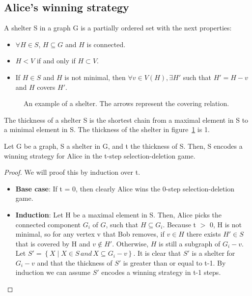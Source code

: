 \subsection{Alice's winning strategy}
\begin{definition}
A shelter S in a graph G is a partially ordered set with the next properties:
\begin{itemize}
  \item $\forall H \in S$, $H \subseteq G$ and $H$ is connected.
  \item $H < V$ if and only if $H \subset V$.
  \item If $H \in S$ and $H$ is not minimal, then $\forall v \in V(H), \exists H'$ such that $H' = H - v$ and $H$ covers $H'$.
\end{itemize}
\end{definition}

\begin{figure}[H]

\caption{An example of a shelter. The arrows represent the covering relation. \label{fig:shelter-example}}
\end{figure}
The thickness of a shelter S is the shortest chain from a maximal element in S to a minimal element in S. The thickness of the shelter in figure~\ref{fig:shelter-example} is 1.
\begin{lemma}
Let G be a graph, S a shelter in G, and t the thickness of S. Then, S encodes a winning strategy for Alice in the t-step selection-deletion game.
\label{lemma:Alice-win}
\end{lemma}
\begin{proof}
We will proof this by induction over t.
\begin{itemize}
  \item \textbf{Base case}: If t = 0, then clearly Alice wins the 0-step selection-deletion game.
  \item \textbf{Induction}: Let H be a maximal element in S. Then, Alice picks the connected component $G_i$ of $G$, such that $H \subseteq G_i$. Because t $>$ 0, H is not minimal, so for any vertex v that Bob removes, if $v \in H$ there exists $H' \in S$ that is covered by H and $v \notin H'$. Otherwise, $H$ is still a subgraph of $G_i - v$. Let $S' =\left\{X \mid X \in S \, and \, X \subseteq G_i - v\right\}$. It is clear that $S'$ is a shelter for $G_i - v$ and that the thickness of $S'$ is greater than or equal to t-1. By induction we can assume $S'$ encodes a winning strategy in t-1 steps.
\end{itemize}
\end{proof}


